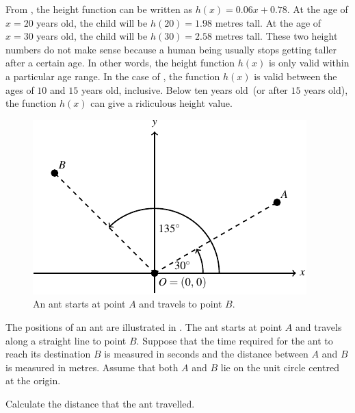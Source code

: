 \documentclass[a4paper,oneside,12pt]{article}
\begin{document}
\begin{problem}
{\begin{solution}
From ,
the height function can be written as $h(x) = 0.06x + 0.78$.  At the
age of $x = 20$ years old, the child will be $h(20) = 1.98$ metres
tall.  At the age of $x = 30$ years old, the child will be
$h(30) = 2.58$ metres tall.  These two height numbers do not make
sense because a human being usually stops getting taller after a
certain age.  In other words, the height function $h(x)$ is only valid
within a particular age range.  In the case of
, the function $h(x)$ is valid
between the ages of $10$ and $15$ years old, inclusive.  Below ten
years old~(or after $15$ years old), the function $h(x)$ can give a
ridiculous height value.
\end{solution}
}{}

\begin{figure}[!htbp]
\centering
\includegraphics[scale=1.5]{image/06/points-unit-circle.pdf}
\caption{%
  An ant starts at point $A$ and travels to point $B$.
}
\label{fig:unit_circle_A_30_degrees_B_135_degrees}
\end{figure}

\item The positions of an ant are illustrated in
  .  The ant starts
  at point $A$ and travels along a straight line to point $B$.
  Suppose that the time required for the ant to reach its destination
  $B$ is measured in seconds and the distance between $A$ and $B$ is
  measured in metres.  Assume that both $A$ and $B$ lie on the unit
  circle centred at the origin.
  \begin{packedenum}
  \item\label{subprob:ant_distance_travelled}
    Calculate the distance that the ant travelled.


\end{packedenum}
\end{problem}
\end{document}
